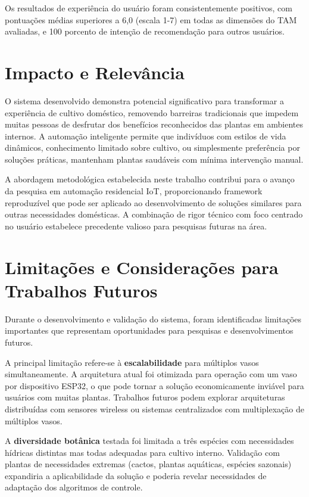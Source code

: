 \documentclass[twoside,english,brazilian]{UNISINOSmonografia}
\begin{document}
Os resultados de experiência do usuário foram consistentemente positivos, com pontuações médias superiores a 6,0 (escala 1-7) em todas as dimensões do TAM avaliadas, e 100 porcento de intenção de recomendação para outros usuários.

\section{Impacto e Relevância}

O sistema desenvolvido demonstra potencial significativo para transformar a experiência de cultivo doméstico, removendo barreiras tradicionais que impedem muitas pessoas de desfrutar dos benefícios reconhecidos das plantas em ambientes internos. A automação inteligente permite que indivíduos com estilos de vida dinâmicos, conhecimento limitado sobre cultivo, ou simplesmente preferência por soluções práticas, mantenham plantas saudáveis com mínima intervenção manual.

A abordagem metodológica estabelecida neste trabalho contribui para o avanço da pesquisa em automação residencial IoT, proporcionando framework reproduzível que pode ser aplicado ao desenvolvimento de soluções similares para outras necessidades domésticas. A combinação de rigor técnico com foco centrado no usuário estabelece precedente valioso para pesquisas futuras na área.

\section{Limitações e Considerações para Trabalhos Futuros}

Durante o desenvolvimento e validação do sistema, foram identificadas limitações importantes que representam oportunidades para pesquisas e desenvolvimentos futuros.

A principal limitação refere-se à \textbf{escalabilidade} para múltiplos vasos simultaneamente. A arquitetura atual foi otimizada para operação com um vaso por dispositivo ESP32, o que pode tornar a solução economicamente inviável para usuários com muitas plantas. Trabalhos futuros podem explorar arquiteturas distribuídas com sensores wireless ou sistemas centralizados com multiplexação de múltiplos vasos.

A \textbf{diversidade botânica} testada foi limitada a três espécies com necessidades hídricas distintas mas todas adequadas para cultivo interno. Validação com plantas de necessidades extremas (cactos, plantas aquáticas, espécies sazonais) expandiria a aplicabilidade da solução e poderia revelar necessidades de adaptação dos algoritmos de controle.
\end{document}
